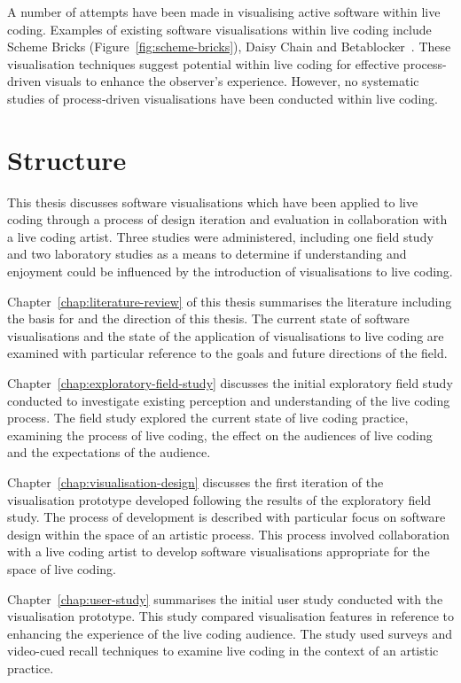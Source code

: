 A number of attempts have been made in visualising active software within live coding. Examples of existing software visualisations within live coding include Scheme Bricks (Figure~\ref{fig:scheme-bricks}), Daisy Chain and Betablocker~\cite{McLean2010a}. These visualisation techniques suggest potential within live coding for effective process-driven visuals to enhance the observer's experience. However, no systematic studies of process-driven visualisations have been conducted within live coding.

\section{Structure}

This thesis discusses software visualisations which have been applied to live coding through a process of design iteration and evaluation in collaboration with a live coding artist. Three studies were administered, including one field study and two laboratory studies as a means to determine if understanding and enjoyment could be influenced by the introduction of visualisations to live coding.

Chapter~\ref{chap:literature-review} of this thesis summarises the literature including the basis for and the direction of this thesis. The current state of software visualisations and the state of the application of visualisations to live coding are examined with particular reference to the goals and future directions of the field.

Chapter~\ref{chap:exploratory-field-study} discusses the initial exploratory field study conducted to investigate existing perception and understanding of the live coding process. The field study explored the current state of live coding practice, examining the process of live coding, the effect on the audiences of live coding and the expectations of the audience.

Chapter~\ref{chap:visualisation-design} discusses the first iteration of the visualisation prototype developed following the results of the exploratory field study. The process of development is described with particular focus on software design within the space of an artistic process. This process involved collaboration with a live coding artist to develop software visualisations appropriate for the space of live coding.

Chapter~\ref{chap:user-study} summarises the initial user study conducted with the visualisation prototype. This study compared visualisation features in reference to enhancing the experience of the live coding audience. The study used surveys and video-cued recall techniques to examine live coding in the context of an artistic practice.

